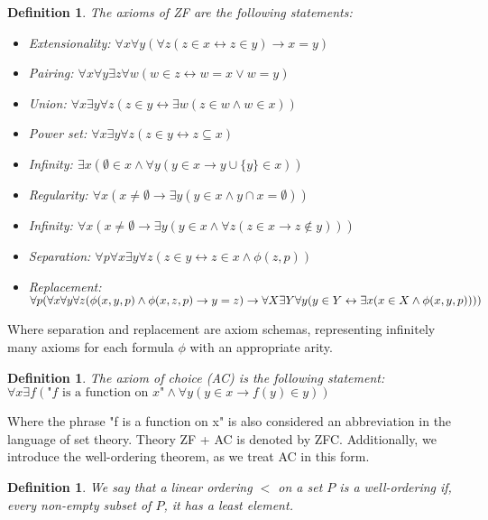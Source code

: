 \documentclass{report}
\newtheorem{dfn}[thm]{Definition}
\begin{document}
\begin{dfn}
  The axioms of ZF are the following statements:
  \begin{itemize}
    \item Extensionality: $\forall x \forall y (\forall z (z \in x \leftrightarrow z \in y) \rightarrow x = y)$
    \item Pairing: $\forall x \forall y \exists z \forall w (w \in z \leftrightarrow w = x \lor w = y)$
    \item Union: $\forall x \exists y \forall z (z \in y \leftrightarrow \exists w (z \in w \land w \in x))$
    \item Power set: $\forall x \exists y \forall z (z \in y \leftrightarrow z \subseteq x)$
    \item Infinity: $\exists x (\emptyset \in x \land \forall y (y \in x \rightarrow y \cup \{y\} \in x))$
    \item Regularity: $\forall x(x \neq \emptyset \rightarrow \exists y (y \in x \land y \cap x = \emptyset))$
    \item Infinity: $\forall x (x \neq \emptyset \rightarrow \exists y (y \in x \land \forall z (z \in x \rightarrow z \notin y)))$
    \item Separation: $\forall p \forall x \exists y \forall z (z \in y \leftrightarrow z \in x \land \phi(z, p))$
    \item Replacement: $\forall p (\forall x \forall y \forall z (\phi(x, y, p) \land \phi(x, z, p) \rightarrow y = z) \rightarrow \\ \forall X \exists Y \forall y (y \in Y \leftrightarrow \exists x (x \in X \land \phi(x, y, p))))$
  \end{itemize}
\end{dfn}
Where separation and replacement are axiom schemas, representing infinitely many axioms for each formula $\phi$ with an appropriate arity.
\begin{dfn} 
  \emph{The axiom of choice (AC)} is the following statement: \\
  $\forall x \exists f (\text{"} f \text{ is a function on } x \text{"} \land \forall y (y \in x \rightarrow f(y) \in y))$
\end{dfn}
Where the phrase "f is a function on x" is also considered an abbreviation in the language of set theory.
Theory ZF + AC is denoted by ZFC.
Additionally, we introduce the well-ordering theorem, as we treat AC in this form.

\begin{dfn}
  We say that a linear ordering $<$ on a set $P$ is a \emph{well-ordering} if, every non-empty subset of $P$, it has a least element.
\end{dfn}
\end{document}

